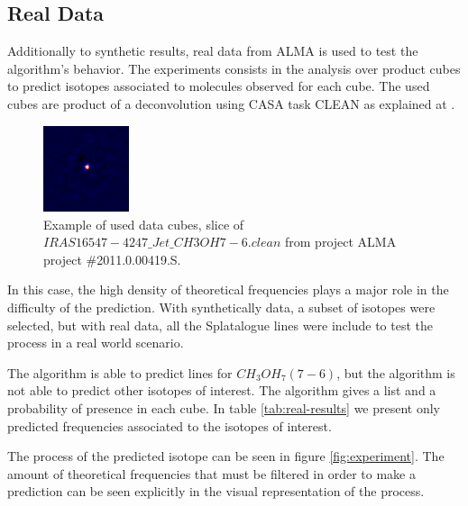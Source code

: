 \subsection{Real Data}

Additionally to synthetic results, real data from ALMA is used to test the algorithm's behavior.
The experiments consists in the analysis over product cubes to predict isotopes associated to molecules observed for each cube.
The used cubes are product of a deconvolution using CASA task CLEAN as explained at \cite{higuchi_iras_2015}.

\begin{figure}[H]
	\begin{center}
		\includegraphics[width=0.225\textwidth]{images/ds9}
		\caption{ Example of used data cubes, slice of $IRAS16547-4247\_Jet\_CH3OH7-6.clean$ from project ALMA project \#2011.0.00419.S.  }
		\label{fig:ds9}
	\end{center}
\end{figure}

In this case, the high density of theoretical frequencies plays a major role in the difficulty of the prediction.
With synthetically data, a subset of isotopes were selected, but with real data, all the Splatalogue lines were include to test the process in a real world scenario.

The algorithm is able to predict lines for $CH_3OH_7 (7-6)$, but the algorithm is not able to predict other isotopes of interest.
The algorithm gives a list and a probability of presence in each cube. In table \ref{tab:real-results} we present only predicted frequencies associated to the isotopes of interest.

The process of the predicted isotope can be seen in figure \ref{fig:experiment}.
The amount of theoretical frequencies that must be filtered in order to make a prediction can be seen explicitly in the visual representation of the process.

